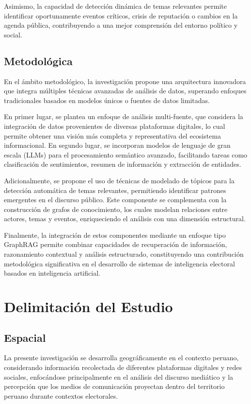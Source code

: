 Asimismo, la capacidad de detección dinámica de temas relevantes permite identificar oportunamente eventos críticos, crisis de reputación o cambios en la agenda pública, contribuyendo a una mejor comprensión del entorno político y social.

\subsection{Metodológica}

En el ámbito metodológico, la investigación propone una arquitectura innovadora que integra múltiples técnicas avanzadas de análisis de datos, superando enfoques tradicionales basados en modelos únicos o fuentes de datos limitadas.

En primer lugar, se plantea un enfoque de análisis multi-fuente, que considera la integración de datos provenientes de diversas plataformas digitales, lo cual permite obtener una visión más completa y representativa del ecosistema informacional. En segundo lugar, se incorporan modelos de lenguaje de gran escala (LLMs) para el procesamiento semántico avanzado, facilitando tareas como clasificación de sentimientos, resumen de información y extracción de entidades.

Adicionalmente, se propone el uso de técnicas de modelado de tópicos para la detección automática de temas relevantes, permitiendo identificar patrones emergentes en el discurso público. Este componente se complementa con la construcción de grafos de conocimiento, los cuales modelan relaciones entre actores, temas y eventos, enriqueciendo el análisis con una dimensión estructural.

Finalmente, la integración de estos componentes mediante un enfoque tipo GraphRAG permite combinar capacidades de recuperación de información, razonamiento contextual y análisis estructurado, constituyendo una contribución metodológica significativa en el desarrollo de sistemas de inteligencia electoral basados en inteligencia artificial.

\section{Delimitación del Estudio}

\subsection{Espacial}

La presente investigación se desarrolla geográficamente en el contexto peruano, considerando información recolectada de diferentes plataformas digitales y redes sociales, enfocándose principalmente en el análisis del discurso mediático y la percepción que los medios de comunicación proyectan dentro del territorio peruano durante contextos electorales.


